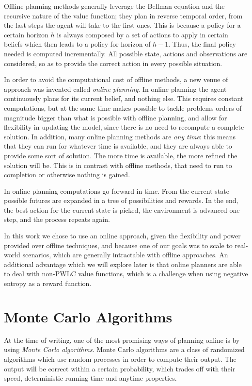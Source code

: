 Offline planning methods generally leverage the Bellman equation and the recursive nature of the
value function; they plan in reverse temporal order, from the last steps the agent will take to the
first ones. This is because a policy for a certain horizon $h$ is always composed by a set of
actions to apply in certain beliefs which then leads to a policy for horizon of $h-1$. Thus, the
final policy needed is computed incrementally. All possible state, actions and observations are
considered, so as to provide the correct action in every possible situation.

In order to avoid the computational cost of offline methods, a new venue of approach was invented 
called \textit{online planning}. In online planning the agent continuously plans for its current
belief, and nothing else. This requires constant computations, but at the same time makes possible
to tackle problems orders of magnitude bigger than what is possible with offline planning, and allow
for flexibility in updating the model, since there is no need to recompute a complete solution. In
addition, many online planning methods are \textit{any time}: this means that they can run for
whatever time is available, and they are always able to provide some sort of solution. The more time
is available, the more refined the solution will be. This is in contrast with offline methods, that
need to run to completion or otherwise nothing is gained.

In online planning computations go forward in time. From the current state possible futures are
expanded in a tree of possibilities and rewards. In the end, the best action for the current state
is picked, the environment is advanced one step, and the process repeats again.

In this work we chose to use an online approach, given the flexibility and power provided over
offline  techniques, and because one of our goals was to scale to real-world scenarios, which are
generally intractable with offline approaches. An additional advantage which we will explore later
is that online planners are able to deal with non-PWLC value functions, which is a challenge when
using negative entropy as a reward function.

\section{Monte Carlo Algorithms}

At the time of writing, one of the most promising ways of planning online is by using \textit{Monte
Carlo algorithms}. Monte Carlo algorithms are a class of randomized algorithms which use random
processes in order to compute their output. The output will be correct within a certain probability,
which trades off with their speed, deterministic running time and anytime properties.

